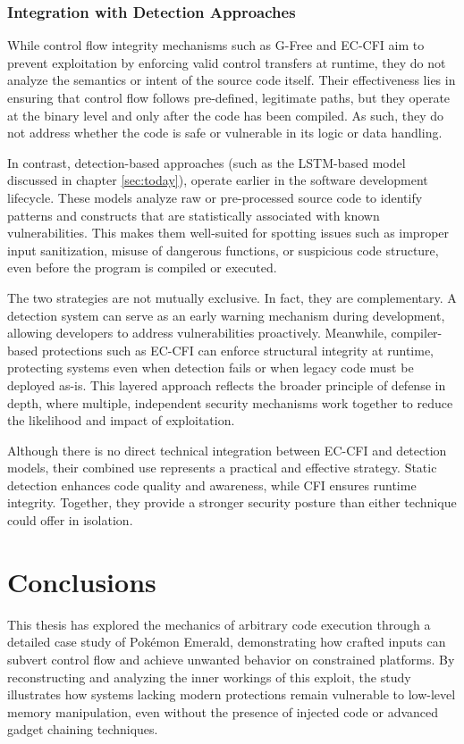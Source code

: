 \documentclass[a4paper]{usiinfbachelorproject}
\begin{document}
\subsubsection{Integration with Detection Approaches}

While control flow integrity mechanisms such as G-Free and EC-CFI aim to prevent exploitation by enforcing valid control transfers at runtime, they do not analyze the semantics or intent of the source code itself. Their effectiveness lies in ensuring that control flow follows pre-defined, legitimate paths, but they operate at the binary level and only after the code has been compiled. As such, they do not address whether the code is safe or vulnerable in its logic or data handling.

In contrast, detection-based approaches (such as the LSTM-based model discussed in chapter \ref{sec:today}), operate earlier in the software development lifecycle. These models analyze raw or pre-processed source code to identify patterns and constructs that are statistically associated with known vulnerabilities. This makes them well-suited for spotting issues such as improper input sanitization, misuse of dangerous functions, or suspicious code structure, even before the program is compiled or executed.

The two strategies are not mutually exclusive. In fact, they are complementary. A detection system can serve as an early warning mechanism during development, allowing developers to address vulnerabilities proactively. Meanwhile, compiler-based protections such as EC-CFI can enforce structural integrity at runtime, protecting systems even when detection fails or when legacy code must be deployed as-is. This layered approach reflects the broader principle of defense in depth, where multiple, independent security mechanisms work together to reduce the likelihood and impact of exploitation.

Although there is no direct technical integration between EC-CFI and detection models, their combined use represents a practical and effective strategy. Static detection enhances code quality and awareness, while CFI ensures runtime integrity. Together, they provide a stronger security posture than either technique could offer in isolation.


\section{Conclusions}

This thesis has explored the mechanics of arbitrary code execution through a detailed case study of Pokémon Emerald, demonstrating how crafted inputs can subvert control flow and achieve unwanted behavior on constrained platforms. By reconstructing and analyzing the inner workings of this exploit, the study illustrates how systems lacking modern protections remain vulnerable to low-level memory manipulation, even without the presence of injected code or advanced gadget chaining techniques.
\end{document}
